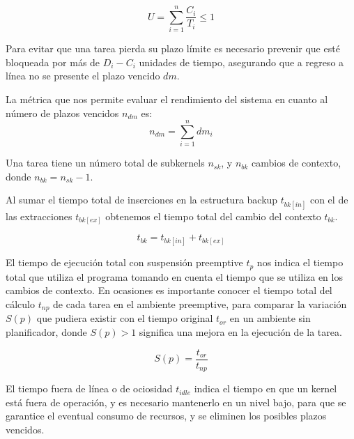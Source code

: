 \begin{equation}
U=\sum_{i=1}^{n} \frac{C_i}{T_i} \leq 1
\end{equation}

Para evitar que una tarea pierda su plazo límite es necesario prevenir que esté bloqueada por más de \textit{$D_i - C_i$} unidades de tiempo, asegurando que a regreso a línea no se presente el plazo vencido $dm$.

La métrica que nos permite evaluar el rendimiento del sistema en cuanto al número de plazos vencidos \textit{$n_{dm}$} es:
\begin{equation}
n_{dm}=\sum_{i=1}^{n} dm_{i}
\end{equation}

Una tarea tiene un número total de subkernels \textit{$n_{sk}$}, y \textit{$n_{bk}$} cambios de contexto, donde  \textbf{$n_{bk} = n_{sk}-1$}.

Al sumar el tiempo total de inserciones en la estructura backup \textit{$t_{bk[in]}$} con el de las extracciones \textit{$t_{bk[ex]}$} obtenemos el tiempo total del cambio del contexto \textit{$t_{bk}$}.

\begin{equation}
t_{bk}=t_{bk[in]}+t_{bk[ex]}
\end{equation}

El tiempo de ejecución total con suspensión preemptive \textit{$t_p$} nos indica el tiempo total que utiliza el programa tomando en cuenta el tiempo que se utiliza en los cambios de contexto. 
En ocasiones es importante conocer el tiempo total del cálculo \textit{$t_{np}$} de cada tarea en el ambiente preemptive, para comparar la variación \textit{$S(p)$} que pudiera existir con el tiempo original \textit{$t_{or}$} en un ambiente sin planificador, donde \textit{$S(p) > 1$} significa una mejora en la ejecución de la tarea.

\begin{equation}
S(p)=\frac{t_{or}}{t_{np}}
\end{equation}

El tiempo fuera de línea o de ociosidad \textit{$t_{idle}$} indica el tiempo en que un kernel está fuera de operación, y es necesario mantenerlo en un nivel bajo, para que se garantice el eventual consumo de recursos, y se eliminen los posibles plazos vencidos.
\newline